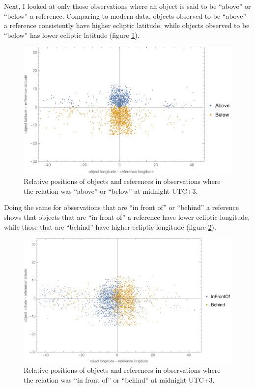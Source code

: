\documentclass{article}
\begin{document}
Next, I looked at only those observations where an object is said to be ``above'' or ``below'' a reference. Comparing to modern data, objects observed to be ``above'' a reference consistently have higher ecliptic latitude, while objects observed to be ``below'' has lower ecliptic latitude (figure \ref{fig:scatterAboveBelow}).

\begin{figure}[h]
    \centering
    \includegraphics[width=0.7\linewidth]{aboveBelowScatter.pdf}
    \caption{Relative positions of objects and references in observations where the relation was ``above'' or ``below'' at midnight UTC+3.}
    \label{fig:scatterAboveBelow}
\end{figure}

Doing the same for observations that are ``in front of'' or ``behind'' a reference shows that objects that are ``in front of'' a reference have lower ecliptic longitude, while those that are ``behind'' have higher ecliptic longitude (figure \ref{fig:scatterInFrontOfBehind}).

\begin{figure}[h]
    \centering
    \includegraphics[width=0.7\linewidth]{infrontofBehindScatter.pdf}
    \caption{Relative positions of objects and references in observations where the relation was ``in front of'' or ``behind'' at midnight UTC+3.}
    \label{fig:scatterInFrontOfBehind}
\end{figure}
\end{document}
